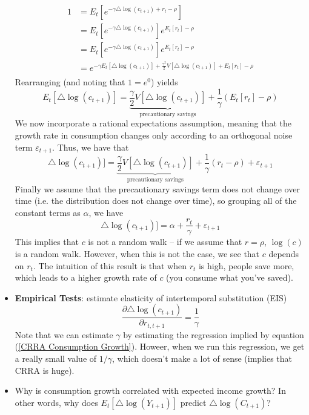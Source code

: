 \documentclass[12pt]{article}
\begin{document}
\begin{itemize}
\[\begin{split}
        1 &= E_t\left[e^{-\gamma \triangle \log(c_{t+1}) + r_t - \rho}\right] \\
        &= E_t\left[e^{-\gamma \triangle \log(c_{t+1})}\right]e^{E_t[r_t] - \rho} \\
        &= E_t\left[e^{-\gamma \triangle \log(c_{t+1})}\right]e^{E_t[r_t] - \rho} \\
        &= e^{-\gamma E_t[\triangle \log(c_{t+1})] + \frac{\gamma^2}{2}V[\triangle \log(c_{t+1})]+E_t[r_t] - \rho} \\
    \end{split}\]
    Rearranging (and noting that $1 = e^0$) yields
    \[E_t[\triangle \log(c_{t+1})] = \underbrace{\frac{\gamma}{2}V[\triangle \log(c_{t+1})]}_{\text{precautionary savings}} + \frac{1}{\gamma}\left(E_t[r_t] - \rho\right)\]
    We now incorporate a rational expectations assumption, meaning that the growth rate in consumption changes only according to an orthogonal noise term $\varepsilon_{t+1}$. Thus, we have that
    \[\triangle \log(c_{t+1})] = \underbrace{\frac{\gamma}{2}V[\triangle \log(c_{t+1})]}_{\text{precautionary savings}} + \frac{1}{\gamma}\left(r_t - \rho\right) + \varepsilon_{t+1}\]
    Finally we assume that the precautionary savings term does not change over time (i.e. the distribution does not change over time), so grouping all of the constant terms as $\alpha$, we have
    \begin{equation}\label{CRRA Consumption Growth}
        \triangle \log(c_{t+1})] = \alpha + \frac{r_t}{\gamma} + \varepsilon_{t+1}
    \end{equation}
    This implies that $c$ is not a random walk -- if we assume that $r = \rho$, $\log(c)$ is a random walk. However, when this is not the case, we see that $c$ depends on $r_t$. The intuition of this result is that when $r_t$ is high, people save more, which leads to a higher growth rate of $c$ (you consume what you've saved). 
    \item \textbf{Empirical Tests}: estimate elasticity of intertemporal substitution (EIS)
    \[\frac{\partial \triangle \log(c_{t+1})}{\partial r_{t,t+1}} = \frac{1}{\gamma}\]
    Note that we can estimate $\gamma$ by estimating the regression implied by equation (\ref{CRRA Consumption Growth}). Howeer, when we run this regression, we get a really small value of $1/\gamma$, which doesn't make a lot of sense (implies that CRRA is huge). 
    \item Why is consumption growth correlated with expected income growth? In other words, why does $E_t[\triangle \log(Y_{t+1})]$ predict $\triangle \log(C_{t+1})$?

\end{itemize}
\end{document}
